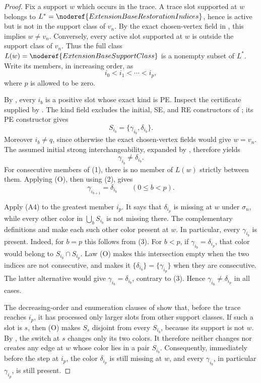 \begin{proof}
Fix a support \(w\) which occurs in the trace.  A trace slot supported at
\(w\) belongs to
\(L^*=\noderef{ExtensionBaseRestorationIndices}\), hence is active but is not
in the support class of \(v_n\).  By the exact chosen-vertex field in
, this implies \(w\ne v_n\).
Conversely, every active slot supported at \(w\) is outside the support class
of \(v_n\).  Thus the full class
\(L(w)=\noderef{ExtensionBaseSupportClass}\) is a nonempty subset of \(L^*\).
Write its members, in increasing order, as
\[
                         i_0<i_1<\cdots<i_p,          \tag{1}
\]
where \(p\) is allowed to be zero.

By , every \(i_b\) is a positive slot
whose exact kind is PE.  Inspect the certificate supplied by
.  The kind field excludes the initial, SE, and RE
constructors of ; its PE constructor gives
\[
                    S_{i_b}=\{\gamma_{i_b},\delta_{i_b}\}.
                                                        \tag{2}
\]
Moreover \(i_b\ne q\), since otherwise the exact chosen-vertex fields would
give \(w=v_n\).  The assumed initial strong interchangeability, expanded by
, therefore yields
\[
                    \gamma_{i_b}\ne\delta_{i_b}.       \tag{3}
\]
For consecutive members of (1), there is no member of \(L(w)\) strictly
between them.  Applying (O), then using (2), gives
\[
              \gamma_{i_{b+1}}=\delta_{i_b}
              \qquad(0\le b<p).                       \tag{4}
\]

Apply (A4) to the greatest member \(i_p\).  It says that
\(\delta_{i_p}\) is missing at \(w\) under \(\sigma_n\), while every other
color in \(\bigcup_b S_{i_b}\) is not missing there.  The complementary
definitions  and  make each
such other color present at \(w\).  In particular, every
\(\gamma_{i_b}\) is present.  Indeed, for \(b=p\) this follows from (3).
For \(b<p\), if \(\gamma_{i_b}=\delta_{i_p}\), that color would belong to
\(S_{i_b}\cap S_{i_p}\).  Law (O) makes this intersection empty when the two
indices are not consecutive, and makes it
\(\{\delta_{i_b}\}=\{\gamma_{i_p}\}\) when they are consecutive.  The
latter alternative would give
\(\gamma_{i_b}=\delta_{i_b}\), contrary to (3).  Hence
\(\gamma_{i_b}\ne\delta_{i_p}\) in all cases.

The decreasing-order and enumeration clauses of
 show that, before the trace reaches
\(i_p\), it has processed only larger slots from other support classes.
If such a slot is \(s\), then (O) makes \(S_s\) disjoint from every
\(S_{i_b}\), because its support is not \(w\).  By
, the switch at \(s\) changes only its two
colors.  It therefore neither changes nor creates any edge at \(w\) whose
color lies in a pair \(S_{i_b}\).  Consequently, immediately before the
step at \(i_p\), the color \(\delta_{i_p}\) is still missing at \(w\), and
every \(\gamma_{i_b}\), in particular \(\gamma_{i_p}\), is still present.


\end{proof}
